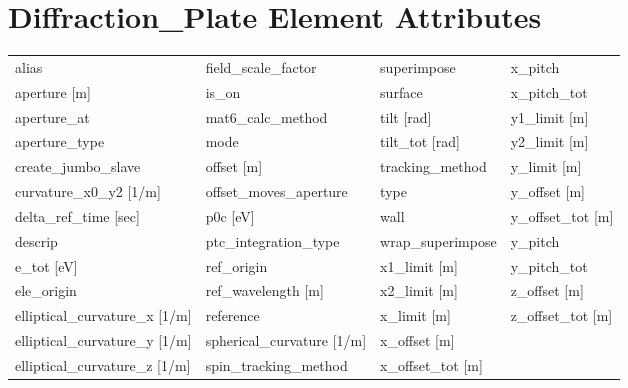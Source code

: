  \section{Diffraction_Plate Element Attributes}
 \label{s:list.diffraction.plate}
 
 \begin{tabular}{llll} \toprule
alias                            & field_scale_factor               & superimpose                      & x_pitch                          \\
aperture [m]                     & is_on                            & surface                          & x_pitch_tot                      \\
aperture_at                      & mat6_calc_method                 & tilt [rad]                       & y1_limit [m]                     \\
aperture_type                    & mode                             & tilt_tot [rad]                   & y2_limit [m]                     \\
create_jumbo_slave               & offset [m]                       & tracking_method                  & y_limit [m]                      \\
curvature_x0_y2 [1/m]            & offset_moves_aperture            & type                             & y_offset [m]                     \\
delta_ref_time [sec]             & p0c [eV]                         & wall                             & y_offset_tot [m]                 \\
descrip                          & ptc_integration_type             & wrap_superimpose                 & y_pitch                          \\
e_tot [eV]                       & ref_origin                       & x1_limit [m]                     & y_pitch_tot                      \\
ele_origin                       & ref_wavelength [m]               & x2_limit [m]                     & z_offset [m]                     \\
elliptical_curvature_x [1/m]     & reference                        & x_limit [m]                      & z_offset_tot [m]                 \\
elliptical_curvature_y [1/m]     & spherical_curvature [1/m]        & x_offset [m]                     &                                  \\
elliptical_curvature_z [1/m]     & spin_tracking_method             & x_offset_tot [m]                 &                                  \\
 \bottomrule
 \end{tabular}
 \vfill
 
